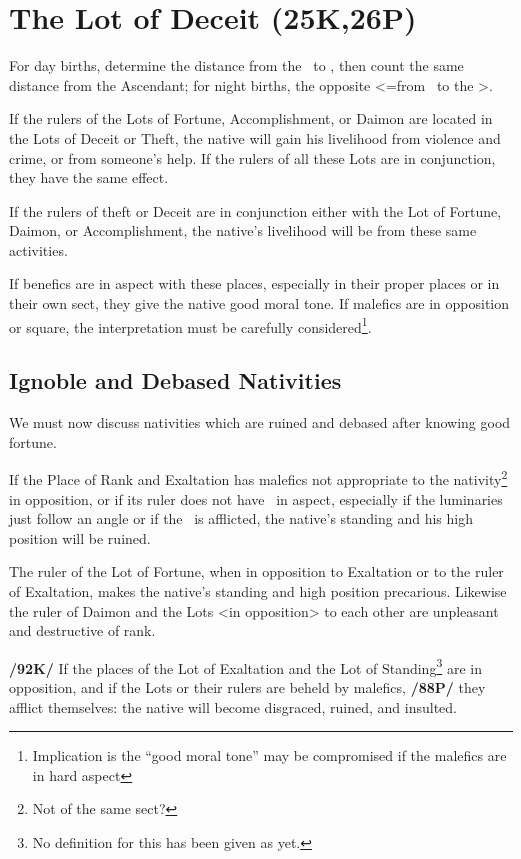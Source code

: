 \section{The Lot of Deceit (25K,26P)}
For day births, determine the distance from the \Sun\, to \Mars, then count the same distance from the Ascendant; for night births, the opposite <=from \Mars\, to the \Sun>. 

If the rulers of the Lots of Fortune, Accomplishment, or Daimon are located in the Lots of Deceit or Theft, the native will gain his livelihood from violence and crime, or from someone’s help. If the rulers of all these Lots are in conjunction, they
have the same effect. 

If the rulers of theft or Deceit are in conjunction either with the Lot of Fortune, Daimon, or Accomplishment, the native’s livelihood will be from these same activities. 

If benefics are in aspect with these places, especially in their proper places or in their own sect, they give the native good moral tone. \mndl If malefics are in opposition or square, the interpretation must be carefully considered\footnote{Implication is the ``good moral tone'' may be compromised if the malefics are in hard aspect}.

\subsection{\textlangle Ignoble and Debased Nativities\textrangle}
We must now discuss nativities which are ruined and debased after knowing good fortune. 

If the Place of Rank and Exaltation has malefics not appropriate to the nativity\footnote{Not of the same sect?} in opposition, or if its ruler does not have \Jupiter\, in aspect, especially if the luminaries just follow an angle or if the \Moon\, is afflicted, the native’s standing and his high position will be ruined. 

The ruler of the Lot of Fortune, when in opposition to Exaltation or to the ruler of Exaltation, makes the native’s standing and high position precarious. Likewise the ruler of Daimon and the Lots <in opposition> to each other are unpleasant and destructive of rank.

\textbf{/92K/} If the places of the Lot of Exaltation and the Lot of Standing\footnote{No definition for this has been given as yet.} are in opposition, and if the Lots or their rulers are beheld by malefics, \textbf{/88P/} they afflict themselves: the native will become disgraced, ruined, and insulted. 

